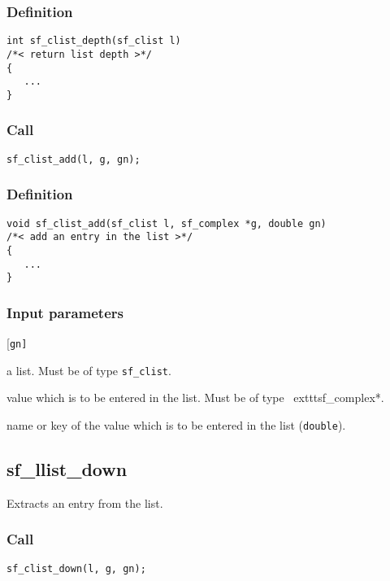 \subsubsection*{Definition}
\begin{verbatim}
int sf_clist_depth(sf_clist l)
/*< return list depth >*/
{
   ...
}
\end{verbatim}

\subsubsection*{Call}
\begin{verbatim}sf_clist_add(l, g, gn);\end{verbatim}

\subsubsection*{Definition}
\begin{verbatim}
void sf_clist_add(sf_clist l, sf_complex *g, double gn) 
/*< add an entry in the list >*/
{    
   ...
}
\end{verbatim}

\subsubsection*{Input parameters}
\begin{desclist}{\tt }{\quad}[\tt gn]
   \setlength\itemsep{0pt}
   \item[l]  a list. Must be of type \texttt{sf\_clist}. 
   \item[g]  value which is to be entered in the list. Must be of type \	exttt{sf\_complex*}.  
   \item[gn] name or key of the value which is to be entered in the list (\texttt{double}).  
\end{desclist}




\subsection{{sf\_llist\_down}}
Extracts an entry from the list.

\subsubsection*{Call}
\begin{verbatim}sf_clist_down(l, g, gn);\end{verbatim}

